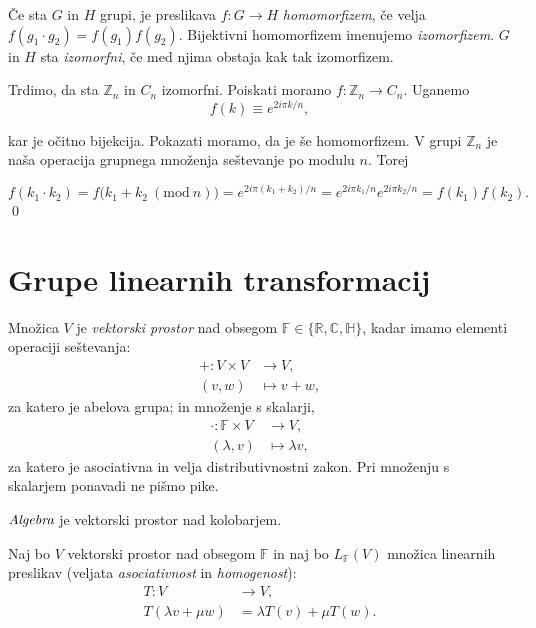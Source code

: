 \begin{defin}
	\v Ce sta $G$ in $H$ grupi, je preslikava $f: G \to H$ \emph{homomorfizem}, \v ce velja $f (g_1 \cdot g_2) = f(g_1) f(g_2)$. Bijektivni
	homomorfizem imenujemo \emph{izomorfizem}. $G$ in $H$ sta \emph{izomorfni}, \v ce med njima obstaja kak tak izomorfizem.
\end{defin}

\begin{zgled}
Trdimo, da sta $\mathbb{Z}_n$ in $C_n$ izomorfni. Poiskati moramo $f: \mathbb{Z}_n \to C_n$. Uganemo
\[
	f(k) \equiv e^{2i\pi k/n},
\]

\ni kar je o\v citno bijekcija. Pokazati moramo, da je \v se homomorfizem. V grupi $\mathbb{Z}_n$ je na\v sa operacija
grupnega mno\v zenja se\v stevanje po modulu $n$. Torej

\[
	f (k_1 \cdot k_2) = f\big(k_1 + k_2\ (\text{mod}\ n)\big) = e^{2i\pi (k_1 + k_2)/n} = e^{2i\pi k_1/n}e^{2i\pi
		k_2/n} = f(k_1) f(k_2).
\]
\qed

\end{zgled}

\pagebreak
\section{Grupe linearnih transformacij}

\begin{defin}
	Mno\v zica $V$ je \emph{vektorski prostor} nad obsegom $\mathbb{F} \in \{\mathbb{R}, \mathbb{C}, \mathbb{H}\}$, kadar imamo
	elementi operaciji se\v stevanja:
	\begin{align*}
		+: V\times V &\to V, \\
		(v, w) &\mapsto v + w,
	\end{align*}
	za katero je abelova grupa; in mno\v zenje s skalarji,
	\begin{align*}
		\cdot: \mathbb{F}\times V &\to V,\\
		(\lambda, v) &\mapsto \lambda v,
	\end{align*}
	za katero je asociativna in velja distributivnostni zakon. Pri mno\v zenju s skalarjem ponavadi ne pi\v smo pike.

	$\emph{Algebra}$ je vektorski prostor nad kolobarjem.
\end{defin}

\ni Naj bo $V$ vektorski prostor nad obsegom $\mathbb{F}$ in naj bo $L_{\mathbb{F}}(V)$ mno\v zica linearnih preslikav (veljata \emph{asociativnost}
in \emph{homogenost}):
\begin{align*}
	T: V &\to V,\\
	T(\lambda v + \mu w) &= \lambda T(v) + \mu T(w).
\end{align*}

